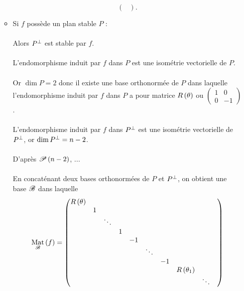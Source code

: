 \begin{dem}
\begin{itemize}
\begin{itemize}
\[\begin{pmatrix}
        \end{pmatrix}.\]
        \item Si \(f\) possède un plan stable \(P\) : \\\\ Alors \(P\ortho\) est stable par \(f\). \\\\ L'endomorphisme induit par \(f\) dans \(P\) est une isométrie vectorielle de \(P\). \\\\ Or \(\dim P=2\) donc il existe une base orthonormée de \(P\) dans laquelle l'endomorphisme induit par \(f\) dans \(P\) a pour matrice \(R\paren{\theta}\) ou \(\begin{pmatrix}
            1 & 0 \\
            0 & -1
        \end{pmatrix}\). \\\\ L'endomorphisme induit par \(f\) dans \(P\ortho\) est une isométrie vectorielle de \(P\ortho\), or \(\dim P\ortho=n-2\). \\\\ D'après \(\P{n-2}\), ... \\\\ En concaténant deux bases orthonormées de \(P\) et \(P\ortho\), on obtient une base \(\fami{B}\) dans laquelle \[\Mat{f}=\begin{pmatrix}
            R\paren{\theta} &   &        &   &    &        &    &                   &        &       \\
                     & 1 &        &   &    &        &    &                   &        &  \\
                     &   & \ddots &   &    &        &    &                   &        &  \\
                     &   &        & 1 &    &        &    &                   &        &  \\
                     &   &        &   & -1 &        &    &                   &        &  \\
                     &   &        &   &    & \ddots &    &                   &        &  \\
                     &   &        &   &    &        & -1 &                   &        &  \\
                     &   &        &   &    &        &    & R\paren{\theta_1} &        &  \\
                     &   &        &   &    &        &    &                   & \ddots &  \\

\end{pmatrix}\]
\end{itemize}
\end{itemize}
\end{dem}
